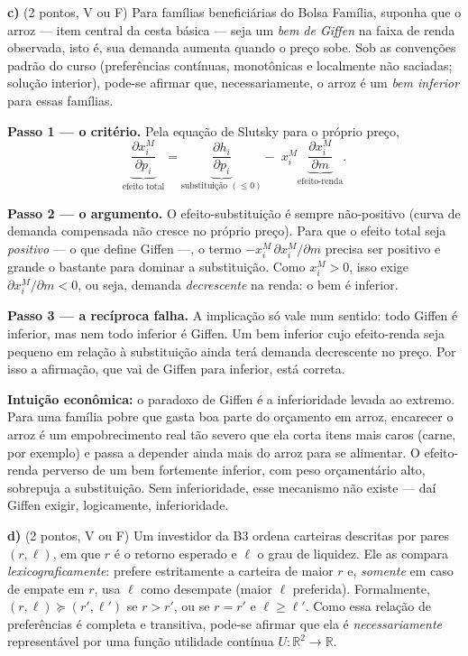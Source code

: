 \textbf{c)} (2 pontos, V ou F) Para famílias beneficiárias do Bolsa Família, suponha que o arroz — item central da cesta básica — seja um \emph{bem de Giffen} na faixa de renda observada, isto é, sua demanda aumenta quando o preço sobe. Sob as convenções padrão do curso (preferências contínuas, monotônicas e localmente não saciadas; solução interior), pode-se afirmar que, necessariamente, o arroz é um \emph{bem inferior} para essas famílias.

\begin{solucao}
\textbf{Passo 1 — o critério.} Pela equação de Slutsky para o próprio preço,
\[
\underbrace{\frac{\partial x_i^{M}}{\partial p_i}}_{\text{efeito total}}=\underbrace{\frac{\partial h_i}{\partial p_i}}_{\text{substituição }(\le 0)}-\;x_i^{M}\underbrace{\frac{\partial x_i^{M}}{\partial m}}_{\text{efeito-renda}}.
\]

\textbf{Passo 2 — o argumento.} O efeito-substituição é sempre não-positivo (curva de demanda compensada não cresce no próprio preço). Para que o efeito total seja \emph{positivo} — o que define Giffen —, o termo $-x_i^{M}\,\partial x_i^{M}/\partial m$ precisa ser positivo e grande o bastante para dominar a substituição. Como $x_i^{M}>0$, isso exige $\partial x_i^{M}/\partial m<0$, ou seja, demanda \emph{decrescente} na renda: o bem é inferior.

\textbf{Passo 3 — a recíproca falha.} A implicação só vale num sentido: todo Giffen é inferior, mas nem todo inferior é Giffen. Um bem inferior cujo efeito-renda seja pequeno em relação à substituição ainda terá demanda decrescente no preço. Por isso a afirmação, que vai de Giffen para inferior, está correta.

\textbf{Intuição econômica:} o paradoxo de Giffen é a inferioridade levada ao extremo. Para uma família pobre que gasta boa parte do orçamento em arroz, encarecer o arroz é um empobrecimento real tão severo que ela corta itens mais caros (carne, por exemplo) e passa a depender ainda mais do arroz para se alimentar. O efeito-renda perverso de um bem fortemente inferior, com peso orçamentário alto, sobrepuja a substituição. Sem inferioridade, esse mecanismo não existe — daí Giffen exigir, logicamente, inferioridade.
\end{solucao}

\textbf{d)} (2 pontos, V ou F) Um investidor da B3 ordena carteiras descritas por pares $(r,\ell)$, em que $r$ é o retorno esperado e $\ell$ o grau de liquidez. Ele as compara \emph{lexicograficamente}: prefere estritamente a carteira de maior $r$ e, \emph{somente} em caso de empate em $r$, usa $\ell$ como desempate (maior $\ell$ preferida). Formalmente, $(r,\ell)\succeq(r',\ell')$ se $r>r'$, ou se $r=r'$ e $\ell\ge\ell'$. Como essa relação de preferências é completa e transitiva, pode-se afirmar que ela é \emph{necessariamente} representável por uma função utilidade contínua $U:\mathbb{R}^2\to\mathbb{R}$.

